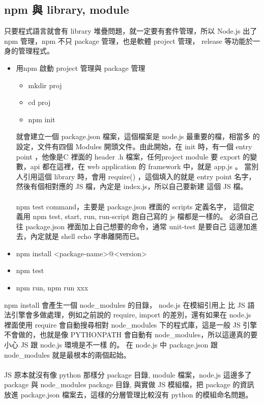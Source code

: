   \subsection{npm 與 library, module}
  只要程式語言就會有 library 堆疊問題，就一定要有套件管理，所以 Node.js
  出了 npm 管理，npm 不只 package 管理，也是軟體 project 管理， release
  等功能於一身的管理程式。
  \begin{itemize}
    \item 用npm 啟動 project 管理與 package 管理
      \begin{itemize}
        \item mkdir proj
        \item cd proj
        \item npm init
      \end{itemize}
      就會建立一個 package.json 檔案，這個檔案是 node.js 最重要的檔，相當多
      的設定，文件有四個 Modules 開頭文件。由此開始，在 init 時，有一個 entry
      point ，他像是C 裡面的 header .h 檔案，任何project module 要 export 
      的變數，api 都在這裡，在 web application 的 framework 中，就是 app.js 
      。 當別人引用這個 library 時，會用 require() ，這個填入的就是 entry
      point 名字，然後有個相對應的 JS 檔，內定是 index.js，所以自己要新建
      這個 JS 檔。
      \\\\
      npm test command，主要是 package.json 裡面的 scripts 定義名字， 這個定
      義用 npm test, start, run, run-script 跑自己寫的 js 檔都是一樣的。
      必須自己往 package.json 裡面加上自己想要的命令，通常 unit-test 是要自己
      這邊加進去，內定就是 shell echo 字串離開而已。
    \item npm install <package-name>@<version>
    \item npm test
    \item npm run, npm run xxx
  \end{itemize}
  npm install 會產生一個 node\_modules 的目錄， node.js 在模組引用上
  比 JS 語法引擎會多做處理，例如之前說的 require, import 的差別，還有如果在
  node.js 裡面使用 require 會自動搜尋相對
  node\_modules 下的程式庫，這是一般 JS 引擎不會做的，也就是像 PYTHONPATH
  會自動有 node\_modules，所以這邊真的要小心 JS 跟 node.js 環境是不一樣
  的。 在 node.js 中 package.json 跟 node\_modules 就是最根本的兩個起始。
  \\\\
  JS 原本就沒有像 python 那樣分 package 目錄, module 檔案，node.js 這邊多了
  package 與 node\_modules package 目錄, 與實做 JS 模組檔，把 package 的資訊
  放進 package.json 檔案去，這樣的分層管理比較沒有 python 的模組命名問題。

